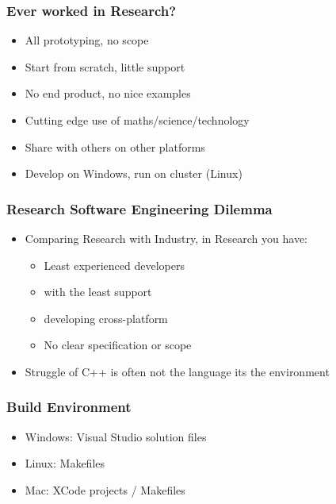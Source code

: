 \hypertarget{ever-worked-in-research}{%
\subsubsection{Ever worked in Research?}\label{ever-worked-in-research}}

\begin{itemize}
\tightlist
\item
  All prototyping, no scope
\item
  Start from scratch, little support
\item
  No end product, no nice examples
\item
  Cutting edge use of maths/science/technology
\item
  Share with others on other platforms
\item
  Develop on Windows, run on cluster (Linux)
\end{itemize}

\hypertarget{research-software-engineering-dilemma}{%
\subsubsection{Research Software Engineering
Dilemma}\label{research-software-engineering-dilemma}}

\begin{itemize}
\tightlist
\item
  Comparing Research with Industry, in Research you have:

  \begin{itemize}
  \tightlist
  \item
    Least experienced developers
  \item
    with the least support
  \item
    developing cross-platform
  \item
    No clear specification or scope
  \end{itemize}
\item
  Struggle of C++ is often not the language its the environment
\end{itemize}

\hypertarget{build-environment}{%
\subsubsection{Build Environment}\label{build-environment}}

\begin{itemize}
\tightlist
\item
  Windows: Visual Studio solution files
\item
  Linux: Makefiles
\item
  Mac: XCode projects / Makefiles
\end{itemize}

